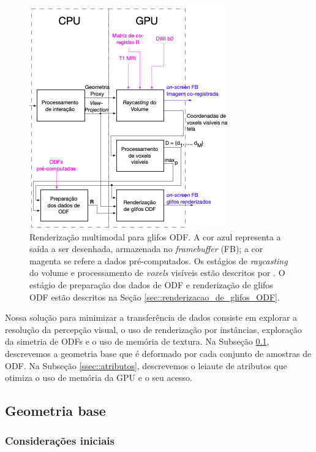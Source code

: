 \documentclass[
    12pt,                %
    oneside,            %
    a4paper,            %
    english,            %
    french,                %
    spanish,            %
    brazil                %
    ]{abntex2}
\begin{document}
\begin{figure}[ht]
    \centering
    \includegraphics[width=.7\linewidth, angle=0]{figs/Esquema_Glifo/fluxograma_glifos_VMTK.png}
    \caption{
    Renderização multimodal para glifos ODF. A cor azul representa a saída a ser desenhada, armazenada no \textit{framebuffer} (FB); a cor magenta se refere a dados pré-computados. Os estágios de \textit{raycasting} do volume e processamento de \textit{voxels} visíveis estão descritos por . O estágio de preparação dos dados de ODF e renderização de glifos ODF estão descritos na Seção \ref{sec::renderizacao_de_glifos_ODF}.
    }
    \label{fig::vmtk_simplified}
\end{figure}

Nossa solução para minimizar a transferência de dados consiste em explorar a resolução da percepção visual, o uso de renderização por instâncias, exploração da simetria de ODFs e o uso de memória de textura. Na Subseção \ref{ssec::geometria_base}, descrevemos a geometria base que é deformado por cada conjunto de amostras de ODF. Na Subseção \ref{ssec::atributos}, descrevemos o leiaute de atributos que otimiza o uso de memória da GPU e o seu acesso.

\subsection{Geometria base}
\label{ssec::geometria_base}

\subsubsection{Considerações iniciais}
\end{document}
